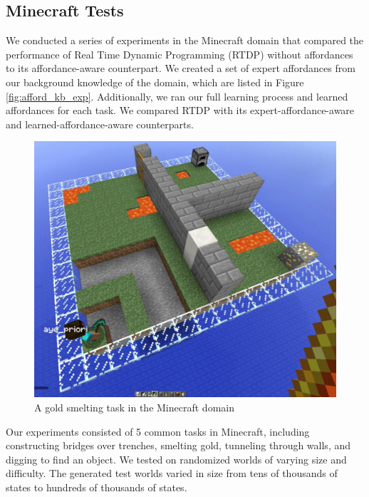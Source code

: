 \documentclass[conference]{IEEEtran}
\begin{document}
\subsection{Minecraft Tests}
We conducted a series of experiments in the Minecraft domain that
compared the performance of Real Time Dynamic Programming (RTDP)
without affordances to its affordance-aware counterpart. We created a set of expert
affordances from our background knowledge of the domain, which are
listed in Figure \ref{fig:afford_kb_exp}. Additionally, we ran our full
learning process and learned affordances for each task. We compared
RTDP with its expert-affordance-aware and learned-affordance-aware 
counterparts. 



\begin{figure}[t]
\centering
\includegraphics[scale=0.13]{figures/epicworld_1.jpg}%
  \caption{A gold smelting task in the Minecraft domain}
  \label{fig:minecraft}
\end{figure}

Our experiments consisted of 5 common tasks in Minecraft, including
constructing bridges over trenches, smelting gold, tunneling
through walls, and digging to find an object.  We tested on 
randomized worlds of varying size and difficulty. The generated test
worlds varied in size from tens of thousands of states to hundreds of thousands of states.
\end{document}
